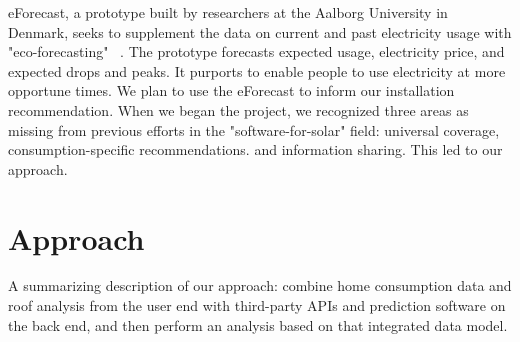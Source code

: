 \documentclass[pageno]{jpaper}
\begin{document}
\newline
eForecast, a prototype built by researchers at the Aalborg University in Denmark, seeks to supplement the data on current and past electricity usage with "eco-forecasting" ~\cite{Kjeldskov:2015:EDE:2702123.2702318}. The prototype forecasts expected usage, electricity price, and expected drops and peaks. It purports to enable people to use electricity at more opportune times. We plan to use the eForecast to inform our installation recommendation. \newline
\newline
\indent When we began the project, we recognized three areas as missing from previous efforts in the "software-for-solar" field: universal coverage, consumption-specific recommendations. and information sharing. This led to our approach.

\section{Approach}
\indent A summarizing description of our approach: combine home consumption data and roof analysis from the user end with third-party APIs and prediction software on the back end, and then perform an analysis based on that integrated data model. \newline
\end{document}
